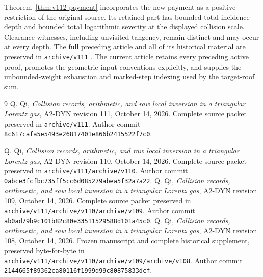 \documentclass[11pt,reqno]{amsart}
\numberwithin{equation}{section}
\theoremstyle{definition}\newtheorem{definition}[theorem]{Definition}
\theoremstyle{remark}\newtheorem{remark}[theorem]{Remark}
\begin{document}
Theorem~\ref{thm:v112-payment} incorporates the new payment as a
positive restriction of the original source. Its retained part has
bounded total incidence depth and bounded total logarithmic severity
at the displayed collision scale. Clearance witnesses, including
unvisited tangency, remain distinct and may occur at every depth.
The full preceding article and all of its historical material are
preserved in \texttt{archive/v111} \cite{Q111}. The current article
retains every preceding active proof, promotes the geometric input
conventions explicitly, and supplies the unbounded-weight exhaustion
and marked-step indexing used by the target-roof sum.












\appendix


\begin{thebibliography}{9}
 Q. Qi,
\emph{Collision records, arithmetic, and raw local inversion in a
triangular Lorentz gas}, A2-DYN revision 111, October 14, 2026.
Complete source packet preserved in \texttt{archive/v111}.
Author commit \texttt{8c617cafa5e5493e26817401e866b2415522f7c0}.

 Q. Qi,
\emph{Collision records, arithmetic, and raw local inversion in a
triangular Lorentz gas}, A2-DYN revision 110, October 14, 2026.
Complete source packet preserved in \texttt{archive/v111/archive/v110}.
Author commit \texttt{0abce3fcfbc735ff5cc6d085279abea5f32a7a22}.
 Q. Qi,
\emph{Collision records, arithmetic, and raw local inversion in a
triangular Lorentz gas}, A2-DYN revision 109, October 14, 2026.
Complete source packet preserved in \texttt{archive/v111/archive/v110/archive/v109}.
Author commit \texttt{ab0ad79b9c101b82c80e33511529588d101a45c0}.
 Q. Qi,
\emph{Collision records, arithmetic, and raw local inversion in a
triangular Lorentz gas}, A2-DYN revision 108, October 14, 2026.
Frozen manuscript and complete historical supplement, preserved
byte-for-byte in \texttt{archive/v111/archive/v110/archive/v109/archive/v108}. Author commit
\texttt{2144665f89362ca80116f1999d99c80875833dcf}.
\end{thebibliography}
\end{document}
